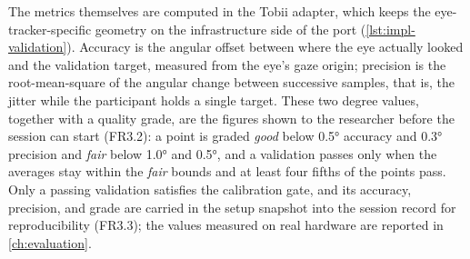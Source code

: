 The metrics themselves are computed in the Tobii adapter, which keeps the eye-tracker-specific geometry on the infrastructure side of the port (\cref{lst:impl-validation}).
Accuracy is the angular offset between where the eye actually looked and the validation target, measured from the eye's gaze origin; precision is the root-mean-square of the angular change between successive samples, that is, the jitter while the participant holds a single target.
These two degree values, together with a quality grade, are the figures shown to the researcher before the session can start (FR3.2): a point is graded \emph{good} below \ang{0.5} accuracy and \ang{0.3} precision and \emph{fair} below \ang{1.0} and \ang{0.5}, and a validation passes only when the averages stay within the \emph{fair} bounds and at least four fifths of the points pass.
Only a passing validation satisfies the calibration gate, and its accuracy, precision, and grade are carried in the setup snapshot into the session record for reproducibility (FR3.3); the values measured on real hardware are reported in \cref{ch:evaluation}.

